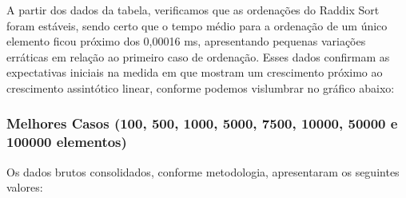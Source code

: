 \documentclass[a4paper, 12pt]{article}
\begin{document}
A partir dos dados da tabela, verificamos que as ordenações do Raddix Sort foram estáveis, sendo certo que o tempo médio para a ordenação de um único elemento ficou próximo dos 0,00016 ms, apresentando pequenas variações erráticas em relação ao primeiro caso de ordenação. Esses dados confirmam as expectativas iniciais na medida em que mostram um crescimento próximo ao crescimento assintótico linear, conforme podemos vislumbrar no gráfico abaixo:

\vspace{0.3cm}
\begin{center}
\end{center}


\subsubsection{Melhores Casos (100, 500, 1000, 5000, 7500, 10000, 50000 e 100000 elementos)}
\tab{ }Os dados brutos consolidados, conforme metodologia, apresentaram os seguintes valores:
\end{document}
